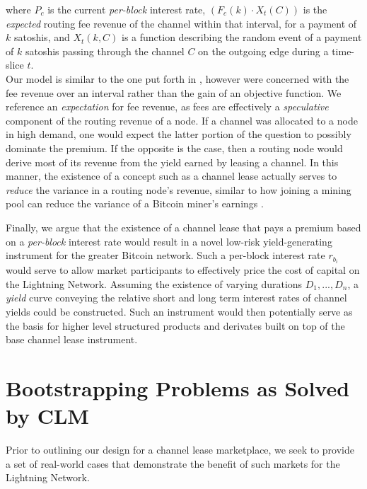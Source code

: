\documentclass[10pt,a4paper]{article}
\theoremstyle{definition}
\begin{document}
where $P_c$ is the current \emph{per-block} interest rate, $(F_c(k)\cdot
X_{t}(C))$ is the \emph{expected} routing fee revenue of the channel within
that interval, for a payment of $k$ satoshis, and $X_{t}(k, C)$ is a function
describing the random event of a payment of $k$ satoshis passing through the
channel $C$ on the outgoing edge during a time-slice $t$. \\

Our model is similar to the one put forth in \cite{payChanProfit}, however were
concerned with the fee revenue over an interval rather than the gain of an
objective function. We reference an \emph{expectation} for fee revenue, as fees
are effectively a \emph{speculative} component of the routing revenue of a
node. If a channel was allocated to a node in high demand, one would expect the
latter portion of the question to possibly dominate the premium. If the
opposite is the case, then a routing node would derive most of its revenue from
the yield earned by leasing a channel. In this manner, the existence of a
concept such as a channel lease actually serves to \emph{reduce} the variance
in a routing node's revenue, similar to how joining a mining pool can reduce
the variance of a Bitcoin miner's earnings \cite{meniVariance}.

Finally, we argue that the existence of a channel lease that pays a premium
based on a \emph{per-block} interest rate would result in a novel low-risk
yield-generating instrument for the greater Bitcoin network. Such a per-block
interest rate $r_{b_i}$ would serve to allow market participants to effectively
price the cost of capital on the Lightning Network. Assuming the existence of
varying durations ${D_1, ..., D_n}$, a \emph{yield} curve conveying the relative
short and long term interest rates of channel yields could be constructed. Such
an instrument would then potentially serve as the basis for higher level
structured products and derivates built on top of the base channel lease
instrument.


\section{Bootstrapping Problems as Solved by CLM}

Prior to outlining our design for a channel lease marketplace, we seek to
provide a set of real-world cases that demonstrate the benefit of such markets
for the Lightning Network. 
\end{document}
